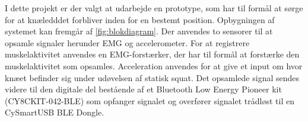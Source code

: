 I dette projekt er der valgt at udarbejde en prototype, som har til formål at sørge for at knæledddet forbliver inden for en bestemt position. Opbygningen af systemet kan fremgår af \autoref{fig:blokdiagram}. Der anvendes to sensorer til at opsamle signaler herunder EMG og accelerometer. For at registrere muskelaktivitet anvendes en EMG-forstærker, der har til formål at forstærke den muskelaktivitet som opsamles. Acceleration anvendes for at give et input om hvor knæet befinder sig under udøvelsen af statisk squat. Det opsamlede signal sendes videre til den digitale del bestående af et Bluetooth Low Energy Pioneer kit (CY8CKIT-042-BLE)  som opfanger signalet og overfører signalet trådløst til en CySmartUSB BLE Dongle. 

